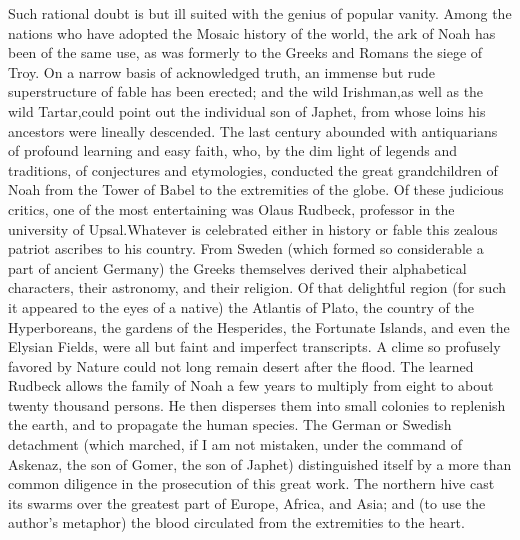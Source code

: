 Such rational doubt is but ill suited with the genius of popular
vanity. Among the nations who have adopted the Mosaic history of
the world, the ark of Noah has been of the same use, as was
formerly to the Greeks and Romans the siege of Troy. On a narrow
basis of acknowledged truth, an immense but rude superstructure
of fable has been erected; and the wild Irishman,\footnotemark[13] as well as
the wild Tartar,\footnotemark[14] could point out the individual son of Japhet,
from whose loins his ancestors were lineally descended. The last
century abounded with antiquarians of profound learning and easy
faith, who, by the dim light of legends and traditions, of
conjectures and etymologies, conducted the great grandchildren of
Noah from the Tower of Babel to the extremities of the globe. Of
these judicious critics, one of the most entertaining was Olaus
Rudbeck, professor in the university of Upsal.\footnotemark[15] Whatever is
celebrated either in history or fable this zealous patriot
ascribes to his country. From Sweden (which formed so
considerable a part of ancient Germany) the Greeks themselves
derived their alphabetical characters, their astronomy, and their
religion. Of that delightful region (for such it appeared to the
eyes of a native) the Atlantis of Plato, the country of the
Hyperboreans, the gardens of the Hesperides, the Fortunate
Islands, and even the Elysian Fields, were all but faint and
imperfect transcripts. A clime so profusely favored by Nature
could not long remain desert after the flood. The learned Rudbeck
allows the family of Noah a few years to multiply from eight to
about twenty thousand persons. He then disperses them into small
colonies to replenish the earth, and to propagate the human
species. The German or Swedish detachment (which marched, if I am
not mistaken, under the command of Askenaz, the son of Gomer, the
son of Japhet) distinguished itself by a more than common
diligence in the prosecution of this great work. The northern
hive cast its swarms over the greatest part of Europe, Africa,
and Asia; and (to use the author’s metaphor) the blood circulated
from the extremities to the heart.



